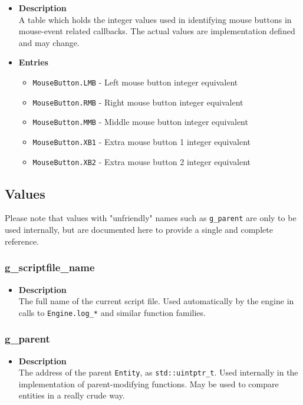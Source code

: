 \documentclass[12pt,a4paper]{article}
\begin{document}
\begin{itemize}
	\item[]{\bf Description}
		\\ A table which holds the integer values used in identifying mouse buttons in mouse-event related callbacks. The actual values are implementation defined and may change.
	\item[]{\bf Entries}
\begin{itemize}
	\item{\texttt{MouseButton.LMB}} - Left mouse button integer equivalent
	\item{\texttt{MouseButton.RMB}} - Right mouse button integer equivalent
	\item{\texttt{MouseButton.MMB}} - Middle mouse button integer equivalent
	\item{\texttt{MouseButton.XB1}} - Extra mouse button 1 integer equivalent
	\item{\texttt{MouseButton.XB2}} - Extra mouse button 2 integer equivalent
	
\end{itemize}
\end{itemize}

\subsection{Values}

Please note that values with "unfriendly" names such as \texttt{g\_parent} are only to be used internally, but are documented here to provide a single and complete reference.

\subsubsection{g\_scriptfile\_name}
\begin{itemize}
	\item[]{\bf Description}
		\\ The full name of the current script file. Used automatically by the engine in calls to \texttt{Engine.log\_*} and similar function families.
\end{itemize}

\subsubsection{g\_parent}
\begin{itemize}
	\item[]{\bf Description}
		\\ The address of the parent \texttt{Entity}, as \texttt{std::uintptr\_t}. Used internally in the implementation of parent-modifying functions. May be used to compare entities in a really crude way.
\end{itemize}
\end{document}
